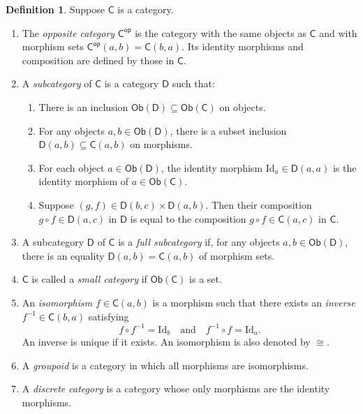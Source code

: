 \documentclass[11pt]{amsbook}
\numberwithin{section}{chapter}
\numberwithin{subsection}{section}
\numberwithin{equation}{section}
\theoremstyle{plain}
\theoremstyle{definition}
\newtheorem{definition}[equation]{Definition}
\newcommand{\op}{\mathsf{op}}
\newcommand{\C}{\mathsf{C}}
\newcommand{\Cop}{\C^{\op}}
\newcommand{\D}{\mathsf{D}}
\newcommand{\Id}{\mathrm{Id}}
\newcommand{\Ob}{\mathsf{Ob}}
\newcommand{\Obc}{\Ob(\C)}
\newcommand{\Obd}{\Ob(\D)}
\newcommand{\comp}{\circ}
\newcommand{\andspace}{\quad\text{and}\quad}
\begin{document}
\begin{definition}\label{def:subcat}
Suppose $\C$ is a category.  
\begin{enumerate}
\item The \emph{opposite category} $\Cop$ is the category with the same objects as $\C$ and with morphism sets $\Cop(a,b) = \C(b,a)$.\label{notation:opposite-category}  Its identity morphisms and composition are defined by those in $\C$.
\item A \emph{subcategory} of $\C$ is a category $\D$ such that:
\begin{enumerate}
\item There is an inclusion $\Obd \subseteq \Obc$ on objects.
\item For any objects $a,b \in \Obd$, there is a subset inclusion $\D(a,b) \subseteq \C(a,b)$ on morphisms.
\item For each object $a \in \Obd$, the identity morphism $\Id_a \in \D(a,a)$ is the identity morphism of $a \in \Obc$.
\item Suppose $(g,f) \in \D(b,c) \times \D(a,b)$.  Then their composition $g \comp f \in \D(a,c)$ in $\D$ is equal to the composition $g \comp f \in \C(a,c)$ in $\C$.
\end{enumerate}
\item A subcategory $\D$ of $\C$ is a \emph{full subcategory} if, for any objects $a,b \in \Obd$, there is an equality $\D(a,b) = \C(a,b)$ of morphism sets.
\item $\C$ is called a \emph{small category} if $\Obc$ is a set.
\item An \emph{isomorphism} $f \in \C(a,b)$ is a morphism such that there exists an \emph{inverse} $f^{-1} \in \C(b,a)$ satisfying
\[f \comp f^{-1} = \Id_b \andspace f^{-1} \comp f = \Id_a.\]
An inverse is unique if it exists.  An isomorphism is also denoted by $\cong$.\label{notation:iso}
\item A \emph{groupoid} is a category in which all morphisms are isomorphisms.  
\item A \emph{discrete category} is a category whose only morphisms are the identity morphisms.
\end{enumerate}
\end{definition}
\end{document}
